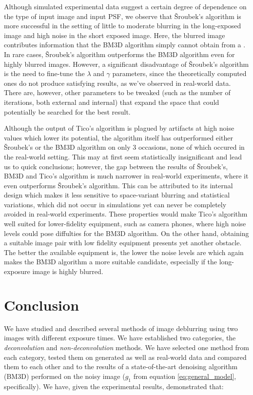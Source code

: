 \documentclass[12pt,notitlepage]{report}
\begin{document}
\clearpage

Although simulated experimental data suggest a certain degree of dependence on the type of input image and input PSF, we observe that Šroubek's algorithm is more successful in the setting of little to moderate blurring in the long-exposed image and high noise in the short exposed image. Here, the blurred image contributes information that the BM3D algorithm simply cannot obtain from a . In rare cases, Šroubek's algorithm outperforms the BM3D algorithm even for highly blurred images. However, a significant disadvantage of Šroubek's algorithm is the need to fine-tune the $\lambda$ and $\gamma$ parameters, since the theoretically computed ones do not produce satisfying results, as we've observed in real-world data. There are, however, other parameters to be tweaked (such as the number of iterations, both external and internal) that expand the space that could potentially be searched for the best result. 

Although the output of Tico's algorithm is plagued by artifacts at high noise values which lower its potential, the algorithm itself has outperformed either Šroubek's or the BM3D algorithm on only 3 occasions, none of which occured in the real-world setting. This may at first seem statistically insignificant and lead us to quick conclusions; however, the gap between the results of Šroubek's, BM3D and Tico's algorithm is much narrower in real-world experiments, where it even outperforms Šroubek's algorithm. This can be attributed to its internal design which makes it less sensitive to space-variant blurring and statistical variations, which did not occur in simulations yet can never be completely avoided in real-world experiments. These properties would make Tico's algorithm well suited for lower-fidelity equipment, such as camera phones, where high noise levels could pose diffulties for the BM3D algorithm. On the other hand, obtaining a suitable image pair with low fidelity equipment presents yet another obstacle. The better the available equipment is, the lower the noise levels are which again makes the BM3D algorithm a more suitable candidate, especially if the long-exposure image is highly blurred.

\chapter{Conclusion}

We have studied and described several methods of image deblurring using two images with different exposure times. We have established two categories, the {\em deconvolution} and {\em non-deconvolution} methods.  We have selected one method from each category, tested them on generated as well as real-world data and compared them to each other and to the results of a state-of-the-art denoising algorithm (BM3D) performed on the noisy image ($g_1$ from equation \ref{eq:general_model}, specifically). We have, given the experimental results, demonstrated that: 
\end{document}
